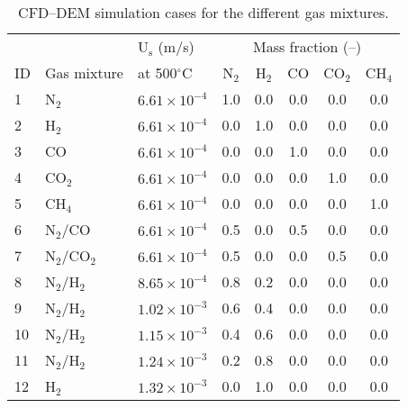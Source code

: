 
\begin{table}[H]
    \centering
    \caption{CFD--DEM simulation cases for the different gas mixtures.}
    \begin{tabular}{lllccccc}
        \toprule
           &               & U$_\text{s}$ (m/s)  &\multicolumn{5}{c}{Mass fraction (--)}  \\
        ID & Gas mixture   & at 500$^\circ$C     & N$_2$ & H$_2$ & CO  & CO$_2$ & CH$_4$  \\
        \midrule
        1  & N$_2$         & $6.61\times10^{-4}$ & 1.0   & 0.0   & 0.0 & 0.0    & 0.0     \\
        2  & H$_2$         & $6.61\times10^{-4}$ & 0.0   & 1.0   & 0.0 & 0.0    & 0.0     \\
        3  & CO            & $6.61\times10^{-4}$ & 0.0   & 0.0   & 1.0 & 0.0    & 0.0     \\
        4  & CO$_2$        & $6.61\times10^{-4}$ & 0.0   & 0.0   & 0.0 & 1.0    & 0.0     \\
        5  & CH$_4$        & $6.61\times10^{-4}$ & 0.0   & 0.0   & 0.0 & 0.0    & 1.0     \\
        6  & N$_2$/CO      & $6.61\times10^{-4}$ & 0.5   & 0.0   & 0.5 & 0.0    & 0.0     \\
        7  & N$_2$/CO$_2$  & $6.61\times10^{-4}$ & 0.5   & 0.0   & 0.0 & 0.5    & 0.0     \\
        8  & N$_2$/H$_2$   & $8.65\times10^{-4}$ & 0.8   & 0.2   & 0.0 & 0.0    & 0.0     \\
        9  & N$_2$/H$_2$   & $1.02\times10^{-3}$ & 0.6   & 0.4   & 0.0 & 0.0    & 0.0     \\
        10 & N$_2$/H$_2$   & $1.15\times10^{-3}$ & 0.4   & 0.6   & 0.0 & 0.0    & 0.0     \\
        11 & N$_2$/H$_2$   & $1.24\times10^{-3}$ & 0.2   & 0.8   & 0.0 & 0.0    & 0.0     \\
        12 & H$_2$         & $1.32\times10^{-3}$ & 0.0   & 1.0   & 0.0 & 0.0    & 0.0     \\
        \bottomrule
    \end{tabular}
    \label{tab:flowrates}
\end{table}
